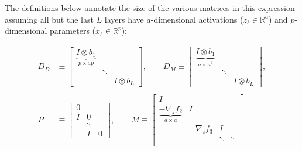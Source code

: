 \documentclass{article}
\begin{document}
The definitions below annotate the size of the various matrices in this
expression assuming all but the last $L$ layers have $a$-dimensional
activations ($z_\ell \in \mathbb{R}^a$) and $p$-dimensional parameters ($x_\ell
    \in \mathbb{R}^p$):

\begin{align*}
    D_D    & \equiv \begin{bmatrix}
                        \underbrace{I \otimes b_1}_{p \times ap} &        &               \\
                                                                 & \ddots &               \\
                                                                 &        & I \otimes b_L
                    \end{bmatrix}
    ,
    \qquad
    D_M \equiv \begin{bmatrix}
                   \underbrace{I \otimes b_1}_{a \times a^2} &        &               \\
                                                             & \ddots &               \\
                                                             &        & I \otimes b_L
               \end{bmatrix}
    ,                                                                                                \\                                                                                     \\
    P      & \equiv \begin{bmatrix}
                        0 \\ I & 0 \\ &\ddots \\ &I&0
                    \end{bmatrix}
    ,    \qquad
    M       \equiv \begin{bmatrix}
                       I                                                                                    \\
                       \underbrace{-\nabla_z f_2}_{a \times a} & I                                          \\
                                                               & -\nabla_z f_3 & I                          \\
                                                               &               & \ddots & \ddots            \\

\end{bmatrix}
\end{align*}
\end{document}
